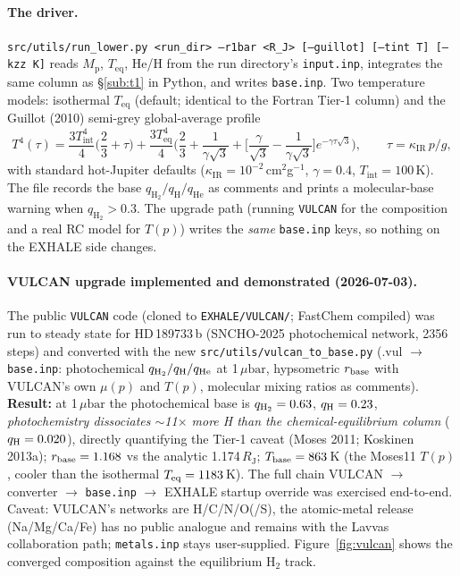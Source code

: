 \documentclass[english,a4paper]{my_memo}
\newcommand{\RJ}{R_{\mathrm{J}}}
\newcommand{\ubar}{\mu\mathrm{bar}}
\newcommand{\qHH}{q_{\mathrm{H_2}}}
\begin{document}
\paragraph{The driver.} \texttt{src/utils/run\_lower.py <run\_dir> --r1bar <R\_J>
[--guillot] [--tint T] [--kzz K]} reads $M_\mathrm{p}$, $T_\mathrm{eq}$, He/H from the run
directory's \texttt{input.inp}, integrates the same column as \S\ref{sub:t1} in Python,
and writes \texttt{base.inp}. Two temperature models: isothermal $T_\mathrm{eq}$
(default; identical to the Fortran Tier-1 column) and the Guillot (2010) semi-grey
global-average profile
\begin{equation}
  T^4(\tau) = \frac{3T_\mathrm{int}^4}{4}\Big(\frac{2}{3}+\tau\Big)
  + \frac{3T_\mathrm{eq}^4}{4}\Big(\frac{2}{3} + \frac{1}{\gamma\sqrt3}
  + \Big[\frac{\gamma}{\sqrt3}-\frac{1}{\gamma\sqrt3}\Big]e^{-\gamma\tau\sqrt3}\Big),
  \qquad \tau = \kappa_\mathrm{IR}\,p/g,
\end{equation}
with standard hot-Jupiter defaults ($\kappa_\mathrm{IR}=10^{-2}$\,cm$^2$g$^{-1}$,
$\gamma=0.4$, $T_\mathrm{int}=100$\,K). The file records the base
$\qHH/q_\mathrm{H}/q_\mathrm{He}$ as comments and prints a molecular-base warning when
$\qHH>0.3$. The upgrade path (running \texttt{VULCAN} for the composition and a real
RC model for $T(p)$) writes the \emph{same} \texttt{base.inp} keys, so nothing on
the EXHALE side changes.

\paragraph{VULCAN upgrade implemented and demonstrated (2026-07-03).} The public
\texttt{VULCAN} code (cloned to \texttt{EXHALE/}\allowbreak\texttt{VULCAN/};
FastChem compiled) was run to
steady state for HD\,189733\,b (SNCHO-2025 photochemical network, 2356 steps) and
converted with the new \texttt{src/utils/vulcan\_to\_base.py} (.vul $\to$
\texttt{base.inp}: photochemical $q_{\rm H_2}/q_{\rm H}/q_{\rm He}$ at 1\,$\ubar$,
hypsometric $r_{\rm base}$ with VULCAN's own $\mu(p)$ and $T(p)$, molecular mixing
ratios as comments). \textbf{Result:} at 1\,$\ubar$ the photochemical base is
$q_{\rm H_2}=0.63$, $q_{\rm H}=0.23$, \emph{photochemistry dissociates
$\sim$11$\times$ more H than the chemical-equilibrium column} ($q_{\rm H}=0.020$),
directly quantifying the Tier-1 caveat (Moses 2011; Koskinen 2013a);
$r_{\rm base}=1.168$ vs the analytic 1.174\,$\RJ$; $T_{\rm base}=863$\,K (the
Moses11 $T(p)$, cooler than the isothermal $T_{\rm eq}=1183$\,K). The full chain
VULCAN $\to$ converter $\to$ \texttt{base.inp} $\to$ EXHALE startup override was
exercised end-to-end. Caveat: VULCAN's networks are H/C/N/O(/S), the atomic-metal
release (Na/Mg/Ca/Fe) has no public analogue and remains with the Lavvas collaboration
path; \texttt{metals.inp} stays user-supplied. Figure~\ref{fig:vulcan} shows the
converged composition against the equilibrium H$_2$ track.
\end{document}
